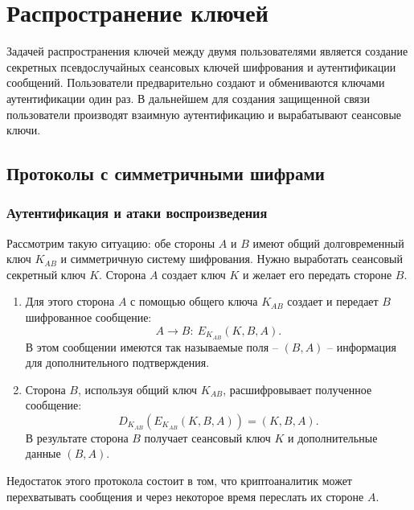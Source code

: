 \documentclass[10pt,a4paper]{book}
\begin{document}






\chapter{Распространение ключей}

Задачей распространения ключей между двумя пользователями является создание секретных псевдослучайных сеансовых ключей шифрования и аутентификации сообщений. Пользователи предварительно создают и обмениваются ключами аутентификации один раз. В дальнейшем для создания защищенной связи пользователи производят взаимную аутентификацию и вырабатывают сеансовые ключи.



\section{Протоколы с симметричными шифрами}

\subsection{Аутентификация и атаки воспроизведения}

Рассмотрим такую ситуацию: обе стороны $A$ и $B$ имеют общий долговременный ключ $K_{AB}$ и симметричную систему шифрования. Нужно выработать сеансовый секретный ключ $K$. Сторона $A$ создает ключ $K$ и желает его передать стороне $B$.

\begin{enumerate}
    \item Для этого сторона $A$ с помощью общего ключа $K_{AB}$ создает и передает $B$ шифрованное сообщение:
            \[ A \rightarrow B: ~ E_{K_{AB}}(K, B, A). \]
        В этом сообщении имеются так называемые поля -- $(B,A)$ -- информация для дополнительного подтверждения.
    \item Сторона $B$, используя общий ключ $K_{AB}$, расшифровывает полученное сообщение:
            \[ D_{K_{AB}}( E_{K_{AB}}( K, B, A)) = (K, B, A). \]
        В результате  сторона $B$ получает сеансовый ключ $K$ и дополнительные данные $(B,A)$.
\end{enumerate}

Недостаток этого протокола состоит в том, что криптоаналитик может перехватывать сообщения и через некоторое время переслать их стороне $A$.
\end{document}
